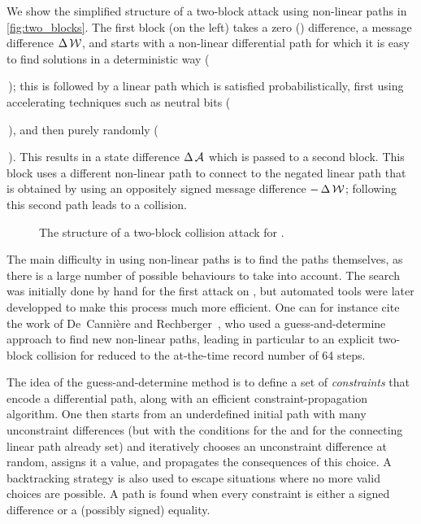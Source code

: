 We show the simplified structure of a two-block attack using non-linear paths in \autoref{fig:two_blocks}. The first block (on the left) takes a zero () \iv difference,
a message difference $\operatorname{\Delta}\mathcal{W}$, and starts with a non-linear differential path  for which it is easy to find solutions in a deterministic way
(\,\,); this is
followed by a linear path  which is satisfied probabilistically, first using accelerating techniques such as neutral bits (\,\,),
and then purely randomly (\,\,). This results in a state difference $\operatorname{\Delta}\mathcal{A}$ which is passed to a second block. This block
uses a different non-linear path  to connect to the negated linear path  that is obtained by using an oppositely signed message difference $-\operatorname{\Delta}\mathcal{W}$; following this second path leads to
a collision.

\begin{figure}[!htb]
\begin{centering}

\caption{The structure of a two-block collision attack for \sha.\label{fig:two_blocks}}
\end{centering}
\end{figure}

\medskip

The main difficulty in using non-linear paths is to find the paths themselves, as there is a large number of possible behaviours to take into account.
The search was initially done by hand for the first attack on \shaone, but automated tools were later developped to make this process much
more efficient. One can for instance cite the work of De~Cannière and Rechberger~\cite{DBLP:conf/asiacrypt/CanniereR06}, who used a guess-and-determine
approach to find new non-linear paths, leading in particular to an explicit two-block collision for \shaone reduced to the at-the-time record number of 64 steps.

The idea of the guess-and-determine method is to define a set of \emph{constraints} that encode a differential path, along with an efficient constraint-propagation
algorithm. One then starts from an underdefined initial path with many unconstraint differences (but with the conditions for the \iv and for the connecting
linear path already set) and iteratively chooses an unconstraint difference at random, assigns it a value, and propagates the consequences of this choice.
A backtracking strategy is also used to escape situations where no more valid choices are possible. A path is found when every constraint is either a signed
difference or a (possibly signed) equality.

